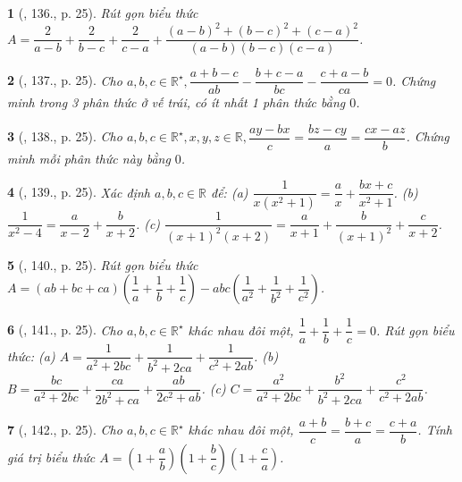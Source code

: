 \documentclass{article}
\newtheorem{baitoan}{}
\begin{document}
\begin{baitoan}[\cite{Binh_Toan_8_tap_1}, 136., p. 25]
	Rút gọn biểu thức $A = \dfrac{2}{a - b} + \dfrac{2}{b - c} + \dfrac{2}{c - a} + \dfrac{(a - b)^2 + (b - c)^2 + (c - a)^2}{(a - b)(b - c)(c - a)}$.
\end{baitoan}

\begin{baitoan}[\cite{Binh_Toan_8_tap_1}, 137., p. 25]
	Cho $a,b,c\in\mathbb{R}^\star,\dfrac{a + b - c}{ab} - \dfrac{b + c - a}{bc} - \dfrac{c + a - b}{ca} = 0$. Chứng minh trong 3 phân thức ở vế trái, có ít nhất 1 phân thức bằng $0$.
\end{baitoan}

\begin{baitoan}[\cite{Binh_Toan_8_tap_1}, 138., p. 25]
	Cho $a,b,c\in\mathbb{R}^\star,x,y,z\in\mathbb{R},\dfrac{ay - bx}{c} = \dfrac{bz - cy}{a} = \dfrac{cx - az}{b}$. Chứng minh mỗi phân thức này bằng $0$.
\end{baitoan}

\begin{baitoan}[\cite{Binh_Toan_8_tap_1}, 139., p. 25]
	Xác định $a,b,c\in\mathbb{R}$ để: (a) $\dfrac{1}{x(x^2 + 1)} = \dfrac{a}{x} + \dfrac{bx + c}{x^2 + 1}$. (b) $\dfrac{1}{x^2 - 4} = \dfrac{a}{x - 2} + \dfrac{b}{x + 2}$. (c) $\dfrac{1}{(x + 1)^2(x + 2)} = \dfrac{a}{x + 1} + \dfrac{b}{(x + 1)^2} + \dfrac{c}{x + 2}$.
\end{baitoan}

\begin{baitoan}[\cite{Binh_Toan_8_tap_1}, 140., p. 25]
	Rút gọn biểu thức $A = (ab + bc + ca)\left(\dfrac{1}{a} + \dfrac{1}{b} + \dfrac{1}{c}\right) - abc\left(\dfrac{1}{a^2} + \dfrac{1}{b^2} + \dfrac{1}{c^2}\right)$.
\end{baitoan}

\begin{baitoan}[\cite{Binh_Toan_8_tap_1}, 141., p. 25]
	Cho $a,b,c\in\mathbb{R}^\star$ khác nhau đôi một, $\dfrac{1}{a} + \dfrac{1}{b} + \dfrac{1}{c} = 0$. Rút gọn biểu thức: (a) $A = \dfrac{1}{a^2 + 2bc} + \dfrac{1}{b^2 + 2ca} + \dfrac{1}{c^2 + 2ab}$. (b) $B = \dfrac{bc}{a^2 + 2bc} + \dfrac{ca}{2b^2 + ca} + \dfrac{ab}{2c^2 + ab}$. (c) $C = \dfrac{a^2}{a^2 + 2bc} + \dfrac{b^2}{b^2 + 2ca} + \dfrac{c^2}{c^2 + 2ab}$.
\end{baitoan}

\begin{baitoan}[\cite{Binh_Toan_8_tap_1}, 142., p. 25]
	Cho $a,b,c\in\mathbb{R}^\star$ khác nhau đôi một, $\dfrac{a + b}{c} = \dfrac{b + c}{a} = \dfrac{c + a}{b}$. Tính giá trị biểu thức $A = \left(1 + \dfrac{a}{b}\right)\left(1 + \dfrac{b}{c}\right)\left(1 + \dfrac{c}{a}\right)$.
\end{baitoan}
\end{document}
